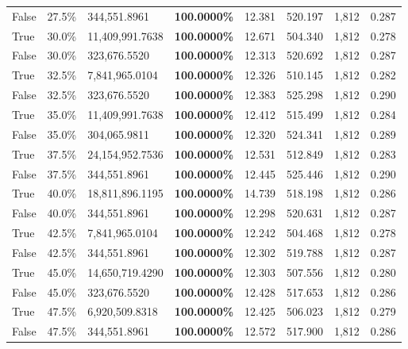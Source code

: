 \begin{table}[H]
\begin{tabular}{lllrllll}
\cline{1-8}
False & 27.5\% & 344,551.8961 & \bfseries \color{red} 100.0000\% & 12.381 & 520.197 & 1,812 & 0.287 \\
\cline{1-8}
True & 30.0\% & 11,409,991.7638 & \bfseries \color{red} 100.0000\% & 12.671 & 504.340 & 1,812 & 0.278 \\
\cline{1-8}
False & 30.0\% & 323,676.5520 & \bfseries \color{red} 100.0000\% & 12.313 & 520.692 & 1,812 & 0.287 \\
\cline{1-8}
True & 32.5\% & 7,841,965.0104 & \bfseries \color{red} 100.0000\% & 12.326 & 510.145 & 1,812 & 0.282 \\
\cline{1-8}
False & 32.5\% & 323,676.5520 & \bfseries \color{red} 100.0000\% & 12.383 & 525.298 & 1,812 & 0.290 \\
\cline{1-8}
True & 35.0\% & 11,409,991.7638 & \bfseries \color{red} 100.0000\% & 12.412 & 515.499 & 1,812 & 0.284 \\
\cline{1-8}
False & 35.0\% & \color{red} 304,065.9811 & \bfseries \color{red} 100.0000\% & 12.320 & 524.341 & 1,812 & 0.289 \\
\cline{1-8}
True & 37.5\% & 24,154,952.7536 & \bfseries \color{red} 100.0000\% & 12.531 & 512.849 & 1,812 & 0.283 \\
\cline{1-8}
False & 37.5\% & 344,551.8961 & \bfseries \color{red} 100.0000\% & 12.445 & 525.446 & 1,812 & 0.290 \\
\cline{1-8}
True & 40.0\% & 18,811,896.1195 & \bfseries \color{red} 100.0000\% & 14.739 & 518.198 & 1,812 & 0.286 \\
\cline{1-8}
False & 40.0\% & 344,551.8961 & \bfseries \color{red} 100.0000\% & 12.298 & 520.631 & 1,812 & 0.287 \\
\cline{1-8}
True & 42.5\% & 7,841,965.0104 & \bfseries \color{red} 100.0000\% & 12.242 & 504.468 & 1,812 & 0.278 \\
\cline{1-8}
False & 42.5\% & 344,551.8961 & \bfseries \color{red} 100.0000\% & 12.302 & 519.788 & 1,812 & 0.287 \\
\cline{1-8}
True & 45.0\% & 14,650,719.4290 & \bfseries \color{red} 100.0000\% & 12.303 & 507.556 & 1,812 & 0.280 \\
\cline{1-8}
False & 45.0\% & 323,676.5520 & \bfseries \color{red} 100.0000\% & 12.428 & 517.653 & 1,812 & 0.286 \\
\cline{1-8}
True & 47.5\% & 6,920,509.8318 & \bfseries \color{red} 100.0000\% & 12.425 & 506.023 & 1,812 & 0.279 \\
\cline{1-8}
False & 47.5\% & 344,551.8961 & \bfseries \color{red} 100.0000\% & 12.572 & 517.900 & 1,812 & 0.286 \\

\end{tabular}
\end{table}
